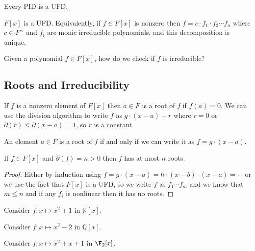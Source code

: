 \begin{theorem}
Every PID is a UFD.
\end{theorem}

\begin{corollary}
$F[x]$ is a UFD. Equivalently, if $f \in F[x]$ is nonzero then $f = c \cdot f_1 \cdot f_2 \cdots f_n$ where $c \in F^\times$ and $f_i$ are monic irreducible polynomials, and this decomposition is unique.
\end{corollary}

\begin{problem}
Given a polynomial $f \in F[x]$, how do we check if $f$ is irreducible?
\end{problem}

\subsection{Roots and Irreducibility}

\begin{definition}
If $f$ is a nonzero element of $F[x]$ then $a \in F$ is a root of $f$ if $f(a) = 0$. We can use the division algorithm to write $f$ as $g \cdot (x-a) + r$ where $r = 0$ or $\partial(r) \leq \partial(x-a) = 1$, so $r$ is a constant.
\end{definition}

\begin{corollary}
An element $a \in F$ is a root of $f$ if and only if we can write it as $f = g \cdot (x-a)$.
\end{corollary}

\begin{corollary}
If $f \in F[x]$ and $\partial(f) = n > 0$ then $f$ has at most $n$ roots.
\end{corollary}

\begin{proof}
Either by induction using $f = g \cdot (x-a) = h \cdot (x-b) \cdot (x-a) = \cdots$ or we use the fact that $F[x]$ is a UFD, so we write $f$ as $f_1 \cdots f_m$ and we know that $m \leq n$ and if any $f_i$ is nonlinear then it has no roots. 
\end{proof}

\begin{example}
\item Consider $f\colon x \mapsto x^2 + 1$ in $\mathbb{R}[x]$.
\item Consdier $f\colon x \mapsto x^2-2$ in $\mathbb{Q}[x]$.
\item Consider $f\colon x \mapsto x^2 + x + 1$ in $\F_2[x]$.
\end{example}

